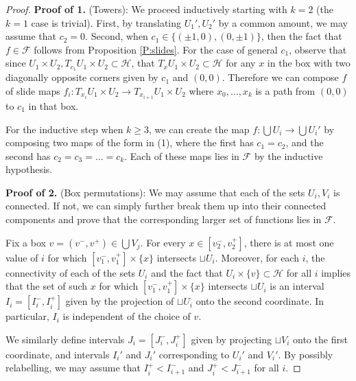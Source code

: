 \documentclass[10pt,a4paper]{amsart}
\newcommand{\X}{\times}
\newcommand{\scrF}{\mathcal{F}}
\newcommand{\scrH}{\mathcal{H}}
\newcommand{\sset}{\subset}
\begin{document}
\begin{proof}
	\textbf{Proof of 1.} (Towers):  \qquad We proceed inductively starting with $k = 2$ (the $k=1$ case is trivial). First, by translating $U_1', U_2'$ by a common amount, we may assume that $c_2 = 0$. Second, when $c_1 \in \{(\pm 1, 0), (0, \pm 1)\}$, then the fact that $f \in \scrF$ follows from Proposition \ref{P:slides}. For the case of general $c_1$, observe that since $U_1 \X U_2, T_{c_1} U_1 \X U_2 \sset \scrH$, that $T_x U_1 \X U_2 \sset \scrH$ for any $x$ in the box with two diagonally opposite corners given by $c_1$ and $(0, 0)$. Therefore we can compose $f$ of slide maps $f_i:T_{x_i} U_1 \X U_2 \to T_{x_{i+1}} U_1 \X U_2$ where $x_0, \dots, x_k$ is a path from $(0, 0)$ to $c_1$ in that box.
	
	For the inductive step when $k \ge 3$, we can create the map $f:\bigcup U_i \to \bigcup U_i'$ by composing two maps of the form in (1), where the first has $c_1 = c_2$, and the second has $c_2 = c_3 = \dots = c_k$. Each of these maps lies in $\scrF$ by the inductive hypothesis.
	
	\textbf{Proof of 2.} (Box permutations): \qquad  We may assume that each of the sets $U_i, V_i$ is connected. If not, we can simply further break them up into their connected components and prove that the corresponding larger set of functions lies in $\scrF$. 
	
	Fix a box $v = (v^-, v^+) \in \bigcup V_j$. For every $x \in [v^-_2, v^+_2]$, there is at most one value of $i$ for which $[v^-_1, v^+_1] \X \{x\}$ intersects $\sqcup U_i$. Moreover, for each $i$, the connectivity of each of the sets $U_i$ and the fact that $U_i \X \{v\} \sset \scrH$ for all $i$ implies that the set of such $x$ for which  $[v^-_1, v^+_1] \X \{x\}$ intersects $\sqcup U_i$ is an interval $I_i = [I_i^-, I_i^+]$ given by the projection of $\sqcup U_i$ onto the second coordinate. In particular, $I_i$ is independent of the choice of $v$.
	
	We similarly define intervals $J_i = [J_i^-, J_i^+]$ given by projecting $\sqcup V_i$ onto the first coordinate, and intervals $I_i'$ and $J_i'$ corresponding to $U_i'$ and $V_i'$. By possibly relabelling, we may assume that $I_i^+ < I^-_{i+1}$ and $J_i^+ < J^-_{i+1}$ for all $i$.
	

\end{proof}
\end{document}
